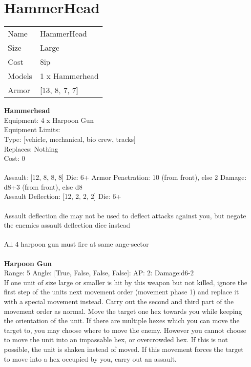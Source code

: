 \pagebreak\pagebreak

\section{ HammerHead }

\begin{tabular}{ll}
  Name & HammerHead \\
  Size & Large\\
  Cost & 8ip\\
  Models & 1 x Hammerhead\\
  Armor & [13, 8, 7, 7]\\
\end{tabular}

\noindent 

{\bf Hammerhead } \\
Equipment: 4 x Harpoon Gun \\
Equipment Limits:  \\
Type: [vehicle, mechanical, bio crew, tracks] \\
Replaces: Nothing \\
Cost: 0\\
\ \\
Assault: [12, 8, 8, 8] Die: 6+ Armor Penetration: 10 (from front), else 2 Damage: d8+3 (from front), else d8 \\
Assault Deflection: [12, 2, 2, 2] Die: 6+\\
\\ 
Assault deflection die may not be used to deflect attacks against you, but negate the enemies assault deflection dice instead\\ 
 
\ \\
All 4 harpoon gun must fire at same ange-sector\\ 

\ \\
{\bf Harpoon Gun } \\



Range: 5  Angle: [True, False, False, False]: AP: 2: Damage:d6-2 \\
If one unit of size large or smaller is hit by this weapon but not killed, ignore the first step of the units next movement order (movement phase 1) and replace it with a special movement instead. Carry out the second and third part of the movement order as normal. Move the target one hex towards you while keeping the orientation of the unit. If there are multiple hexes which you can move the target to, you may choose where to move the enemy. However you cannot choose to move the unit into an impassable hex, or overcrowded hex. If this is not possible, the unit is shaken instead of moved. If this movement forces the target to move into a hex occupied by you, carry out an assault.\\ 





